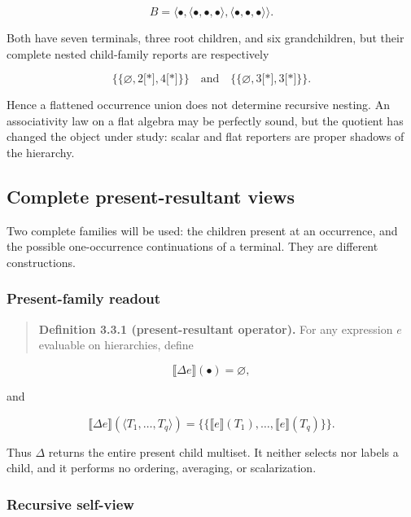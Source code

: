 \documentclass[11pt,a4paper]{article}
\begin{document}
\[B = \langle \bullet ,\langle \bullet , \bullet , \bullet \rangle,\langle \bullet , \bullet , \bullet \rangle\rangle.\]

Both have seven terminals, three root children, and six grandchildren,
but their complete nested child-family reports are respectively

\[\{\{\varnothing,2\lbrack*\rbrack,4\lbrack*\rbrack\}\}\quad\text{and}\quad\{\{\varnothing,3\lbrack*\rbrack,3\lbrack*\rbrack\}\}.\]

Hence a flattened occurrence union does not determine recursive nesting.
An associativity law on a flat algebra may be perfectly sound, but the
quotient has changed the object under study: scalar and flat reporters
are proper shadows of the hierarchy.

\subsection{Complete present-resultant
views}

Two complete families will be used: the children present at an
occurrence, and the possible one-occurrence continuations of a terminal.
They are different constructions.

\subsubsection{Present-family
readout}

\begin{quote}
\textbf{Definition 3.3.1 (present-resultant operator).} For any
expression \(e\) evaluable on hierarchies, define
\end{quote}

\[\ensuremath{\llbracket}\Delta e\ensuremath{\rrbracket}( \bullet ) = \varnothing,\]

and

\[\ensuremath{\llbracket}\Delta e\ensuremath{\rrbracket}\left( \langle T_{1},\ldots,T_{q}\rangle \right) = \{\{ \ensuremath{\llbracket}e\ensuremath{\rrbracket}\left( T_{1} \right),\ldots,\ensuremath{\llbracket}e\ensuremath{\rrbracket}\left( T_{q} \right)\}\}.\]

Thus \(\Delta\) returns the entire present child multiset. It neither
selects nor labels a child, and it performs no ordering, averaging, or
scalarization.

\subsubsection{Recursive self-view}
\end{document}
